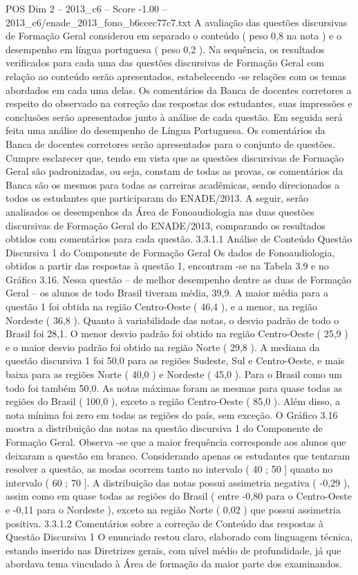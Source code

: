 \begin{textsample}{POS Dim 2 – 2013\_c6 – Score -1.00 – 2013\_c6/enade\_2013\_fono\_b6ccec77c7.txt}
A avaliação das questões discursivas de Formação Geral considerou em separado o conteúdo ( peso 0,8 na nota ) e o desempenho em língua portuguesa ( peso 0,2 ).
Na sequência, os resultados verificados para cada uma das questões discursivas de Formação Geral com relação ao conteúdo serão apresentados, estabelecendo -se relações com os temas abordados em cada uma delas.
Os comentários da Banca de docentes corretores a respeito do observado na correção das respostas dos estudantes, suas impressões e conclusões serão apresentados junto à análise de cada questão.
Em seguida será feita uma análise do desempenho de Língua Portuguesa.
Os comentários da Banca de docentes corretores serão apresentados para o conjunto de questões.
Cumpre esclarecer que, tendo em vista que as questões discursivas de Formação Geral são padronizadas, ou seja, constam de todas as provas, os comentários da Banca são os mesmos para todas as carreiras acadêmicas, sendo direcionados a todos os estudantes que participaram do ENADE/2013.
A seguir, serão analisados os desempenhos da Área de Fonoaudiologia nas duas questões discursivas de Formação Geral do ENADE/2013, comparando os resultados obtidos com comentários para cada questão. 3.3.1.1 Análise de Conteúdo Questão Discursiva 1 do Componente de Formação Geral Os dados de Fonoaudiologia, obtidos a partir das respostas à questão 1, encontram -se na Tabela 3.9 e no Gráfico 3.16.
Nessa questão – de melhor desempenho dentre as duas de Formação Geral – os alunos de todo Brasil tiveram média, 39,9.
A maior média para a questão 1 foi obtida na região Centro-Oeste ( 46,4 ), e a menor, na região Nordeste ( 36,8 ).
Quanto à variabilidade das notas, o desvio padrão de todo o Brasil foi 28,1.
O menor desvio padrão foi obtido na região Centro-Oeste ( 25,9 ) e o maior desvio padrão foi obtido na região Norte ( 29,8 ).
A mediana da questão discursiva 1 foi 50,0 para as regiões Sudeste, Sul e Centro-Oeste, e mais baixa para as regiões Norte ( 40,0 ) e Nordeste ( 45,0 ).
Para o Brasil como um todo foi também 50,0.
As notas máximas foram as mesmas para quase todas as regiões do Brasil ( 100,0 ), exceto a região Centro-Oeste ( 85,0 ).
Além disso, a nota mínima foi zero em todas as regiões do país, sem exceção.
O Gráfico 3.16 mostra a distribuição das notas na questão discursiva 1 do Componente de Formação Geral.
Observa -se que a maior frequência corresponde aos alunos que deixaram a questão em branco.
Considerando apenas os estudantes que tentaram resolver a questão, as modas ocorrem tanto no intervalo ( 40 ; 50 ] quanto no intervalo ( 60 ; 70 ].
A distribuição das notas possui assimetria negativa ( -0,29 ), assim como em quase todas as regiões do Brasil ( entre -0,80 para o Centro-Oeste e -0,11 para o Nordeste ), exceto na região Norte ( 0,02 ) que possui assimetria positiva. 3.3.1.2 Comentários sobre a correção de Conteúdo das respostas à Questão Discursiva 1 O enunciado restou claro, elaborado com linguagem técnica, estando inserido nas Diretrizes gerais, com nível médio de profundidade, já que abordava tema vinculado à Área de formação da maior parte dos examinandos.

\end{textsample}
